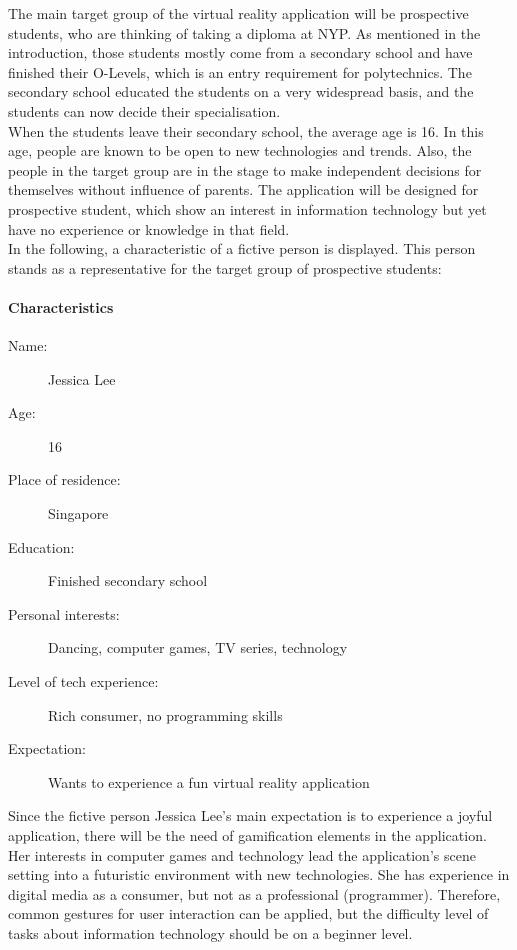 The main target group of the virtual reality application will be prospective students, who are thinking of taking a diploma at NYP. As mentioned in the introduction, those students mostly come from a secondary school and have finished their O-Levels, which is an entry requirement for polytechnics. The secondary school educated the students on a very widespread basis, and the students can now decide their specialisation. \\
When the students leave their secondary school, the average age is 16. In this age, people are known to be open to new technologies and trends. Also, the people in the target group are in the stage to make independent decisions for themselves without influence of parents. The application will be designed for prospective student, which show an interest in information technology but yet have no experience or knowledge in that field.\\
In the following, a characteristic of a fictive person is displayed. This person stands as a representative for the target group of prospective students:

\paragraph{Characteristics}
\begin{description}
	\item[Name:] Jessica Lee
	\item[Age:] 16
	\item[Place of residence:] Singapore
	\item[Education:] Finished secondary school
	\item[Personal interests:] Dancing, computer games, TV series, technology
	\item[Level of tech experience:] Rich consumer, no programming skills
	\item[Expectation:] Wants to experience a fun virtual reality application
\end{description}
Since the fictive person Jessica Lee's main expectation is to experience a joyful application, there will be the need of gamification elements in the application. Her interests in computer games and technology lead the application's scene setting into a futuristic environment with new technologies. She has experience in digital media as a consumer, but not as a professional (programmer). Therefore, common gestures for user interaction can be applied, but the difficulty level of tasks about information technology should be on a beginner level. 
